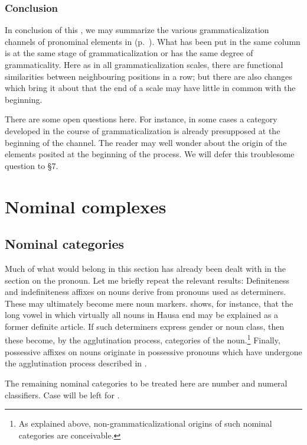 \subsubsection{Conclusion}
In conclusion of this , we may summarize the various grammaticalization channels of pronominal elements in  (p.~\pageref{interrelatedpronomel}).
What has been put in the same column is at the same stage of grammaticalization or has the same degree of grammaticality. Here as in all grammaticalization scales, there are functional similarities between neighbouring positions in a row; but there are also changes which bring it about that the end of a scale may have little in common with the beginning.

There are some open questions here. For instance, in some cases a category developed in the course of grammaticalization is already presupposed at the beginning of the channel. The reader may well wonder about the origin of the elements posited at the beginning of the process. We will defer this troublesome question to §7.

\section{Nominal complexes}
\subsection{Nominal categories}

Much of what would belong in this section has already been dealt with in the section on the pronoun. Let me briefly repeat the relevant results: Definiteness and indefiniteness affixes on nouns derive from pronouns used as determiners. These may ultimately become mere noun markers.\label{page59} \citet[§5.3]{Greenberg1978} shows, for instance, that the long vowel in which virtually all nouns in Hausa end may be explained as a former definite article. If such determiners express gender or noun class, then these become, by the agglutination process, categories of the noun.\footnote{As explained above, non-grammaticalizational origins of such nominal categories are conceivable.} Finally, possessive affixes on nouns originate in possessive pronouns which have undergone the agglutination process described in .

The remaining nominal categories to be treated here are number and numeral classifiers. Case will be left for .

